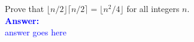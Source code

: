 \item{}
Prove that $\lfloor n/2\rfloor\lceil n/2\rceil=\lfloor n^2/4\rfloor$ for all
integers $n$.
\\[12pt]
\ifanswers
\textcolor{blue}{
\textbf{Answer:}\\[6pt]
answer goes here
}
\newpage
\fi
